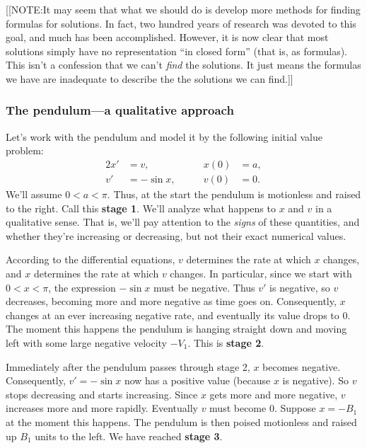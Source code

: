 [[NOTE:It may seem that what we should do is develop more methods for
  finding formulas for solutions.  In fact, two hundred years of
  research was devoted to this goal, and much has been accomplished.
  However, it is now clear that most solutions simply have no
  representation ``in closed form'' (that
  is, as formulas).  This isn't a confession that we can't {\em
    find\/} the solutions.  It just means the formulas we have are
  inadequate to describe the the solutions we can find.]]



\subsubsection{The pendulum---a qualitative approach}
\label{subsubsec:the-pendulum---a-qualitative-approach}


Let's work with the pendulum and model it by the following initial
value problem:
\begin{alignat*}{2}
x' &= v,        &\qquad  x(0) &= a, \\
v' &= -\sin{x}, &\qquad  v(0) &= 0.
\end{alignat*}
We'll assume $0 < a < \pi$.  Thus, at the start the pendulum is
motionless and raised to the right.  Call this {\bf stage 1}.  We'll
analyze what happens to $x$ and $v$ in a qualitative sense.  That is,
we'll pay attention to the {\em signs\/} of these quantities, and
whether they're increasing or decreasing, but not their exact
numerical values.


According to the differential equations, $v$ determines the rate at
which $x$ changes, and $x$ determines the rate at which $v$ changes.
In particular, since we start with $0 < x < \pi$, the expression
$-\sin{x}$ must be negative.  Thus $v'$ is negative, so $v$ decreases,
becoming more and more negative as time goes on.  Consequently, $x$
changes at an ever increasing negative rate, and eventually its value
drops to 0.  The moment this happens the pendulum is hanging straight
down and moving left with some large negative velocity $-V_1$.  This
is {\bf stage 2}.

Immediately after the pendulum passes through stage 2, $x$ becomes
negative.  Consequently, $v' = -\sin{x}$ now has a positive value
(because $x$ is negative).  So $v$ stops decreasing and starts
increasing.  Since $x$ gets more and more negative, $v$ increases more
and more rapidly.  Eventually $v$ must become 0.  Suppose $x = -B_1$
at the moment this happens.  The pendulum is then poised motionless
and raised up $B_1$ units to the left.  We have reached {\bf stage 3}.

